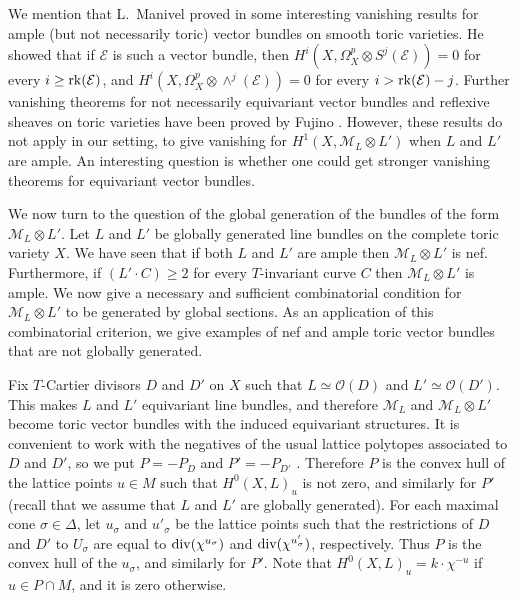 \documentclass[12pt]{amsart}
\theoremstyle{definition}
\theoremstyle{remark}
\begin{document}
We mention that L.~Manivel proved in \cite{Man} some interesting
vanishing results for ample (but not necessarily toric) vector
bundles on smooth toric varieties. He showed that if ${\mathcal{E}}$ is such a
vector bundle, then $H^i(X,\Omega_X^p\otimes S^j({\mathcal{E}}))=0$ for every
$i\geq {\rm rk}({\mathcal{E}})$, and $H^i(X,\Omega_X^p\otimes\wedge^j({\mathcal{E}}))=0$
for every $i>{\rm rk}({\mathcal{E}})-j$. Further vanishing theorems for not necessarily
equivariant vector bundles and reflexive sheaves on toric varieties
have been proved by Fujino \cite{Fujino}.  However, these results do
not apply in our setting, to give vanishing for $H^1(X, {\mathcal{M}}_L \otimes L')$ when $L$ and $L'$ 
are ample. An
interesting question is whether one could get stronger vanishing theorems for equivariant vector bundles.

\bigskip

We now turn to the question of the global generation of the bundles of the form ${\mathcal{M}}_L\otimes
L'$. Let $L$ and $L'$ be globally generated line bundles on the complete toric variety $X$. 
We have seen that 
if both $L$ and $L'$ are ample then
${\mathcal{M}}_L \otimes L'$ is nef.  Furthermore, if $(L' \cdot C)\geq 2$ for every $T$-invariant curve $C$ then ${\mathcal{M}}_L \otimes L'$ is ample.  We now give a necessary and sufficient combinatorial condition for
 ${\mathcal{M}}_L \otimes L'$ to be generated by global sections.  As an application of this combinatorial criterion, we give examples of nef and ample toric vector bundles that are not globally generated.

Fix $T$-Cartier divisors $D$ and $D'$ on $X$ such that $L\simeq{\mathcal{O}}(D)$ and $L'\simeq{\mathcal{O}}(D')$.
This makes $L$ and $L'$ equivariant line bundles, and 
therefore ${\mathcal{M}}_L$ and ${\mathcal{M}}_L \otimes L'$ become toric vector bundles with the induced equivariant structures.  It is convenient to work with the negatives of the usual lattice polytopes associated 
to $D$ and $D'$, so we put
$P=-P_{D}$ and $P'=-P_{D'}$ .
Therefore $P$ is the convex hull of the lattice points $u \in M$ such that $H^0(X,L)_u$ is not zero, and similarly for $P'$ (recall that we assume that $L$ and $L'$ are globally generated).  For each maximal cone $\sigma \in \Delta$, let $u_\sigma$ and $u'_\sigma$ be the lattice points such that the restrictions of $D$ and $D'$ to $U_\sigma$ are equal to ${\rm div}(\chi^{u_\sigma})$ and ${\rm div}
(\chi^{u'_\sigma})$, respectively.
Thus $P$ is the convex hull of the $u_{\sigma}$, and similarly for $P'$.
Note that $H^0(X,L)_u=k\cdot \chi^{-u}$ if $u\in P\cap M$, and it is zero otherwise.
\end{document}
